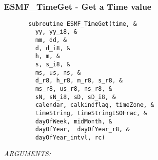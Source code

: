  
\mbox{}\hrulefill\ 
 
\subsubsection [ESMF\_TimeGet] {ESMF\_TimeGet - Get a Time value }


 
\begin{verbatim}       subroutine ESMF_TimeGet(time, &
         yy, yy_i8, &
         mm, dd, &
         d, d_i8, &
         h, m, &
         s, s_i8, &
         ms, us, ns, &
         d_r8, h_r8, m_r8, s_r8, &
         ms_r8, us_r8, ns_r8, &
         sN, sN_i8, sD, sD_i8, &
         calendar, calkindflag, timeZone, &
         timeString, timeStringISOFrac, &
         dayOfWeek, midMonth, &
         dayOfYear,  dayOfYear_r8, &
         dayOfYear_intvl, rc)
 \end{verbatim}{\em ARGUMENTS:}
